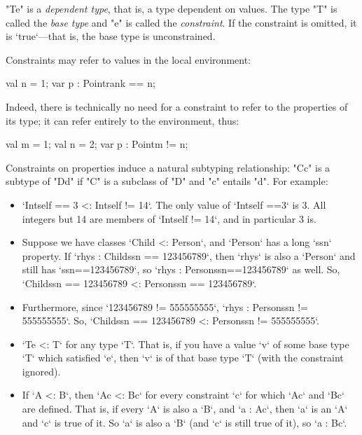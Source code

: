\xcd"T{e}" is a {\em dependent type}, that is, a type dependent on values. The
type \xcd"T" is called the {\em base type} and \xcd"e" is called the {\em
  constraint}. If the constraint is omitted, it is \xcd`true`---that is, the
  base type is unconstrained.

Constraints may refer to values in the local environment: 
\begin{xten}
     val n = 1;
     var p : Point{rank == n};
\end{xten}
Indeed, there is technically no need for a constraint to refer to the
properties of its type; it can refer entirely to the environment, thus: 
\begin{xten}
     val m = 1;
     val n = 2;
     var p : Point{m != n};
\end{xten}

Constraints on properties induce a natural subtyping relationship:
\xcd"C{c}" is a subtype of
\xcd"D{d}" if \xcd"C" is a subclass of \xcd"D" and
\xcd"c" entails \xcd"d".
For example: 
\begin{itemize}
\item \xcd`Int{self == 3} <: Int{self != 14}`.  The only value of
      \xcd`Int{self ==3}` is 3.  All integers but 14 are members of
      \xcd`Int{self != 14}`, and in particular 3 is.  
\item Suppose we have classes \xcd`Child <: Person`, and \xcd`Person` has a
      long \xcd`ssn` property.  If \xcd`rhys : Child{ssn == 123456789}`, then
      \xcd`rhys` is also a \xcd`Person` and still has \xcd`ssn==123456789`, so 
      \xcd`rhys : Person{ssn==123456789}` as well.  
      So, \xcd`Child{ssn == 123456789} <: Person{ssn == 123456789}`.
\item Furthermore, since \xcd`123456789 != 555555555`, 
      \xcd`rhys : Person{ssn != 555555555}`.  
      So, \xcd`Child{ssn == 123456789} <: Person{ssn != 555555555}`.  
\item \xcd`T{e} <: T` for any type \xcd`T`.  That is, if you have a value
      \xcd`v` of some base type \xcd`T` which satisfied \xcd`e`, then \xcd`v`
      is of that base type \xcd`T` (with the constraint ignored).
\item If \xcd`A <: B`, then \xcd`A{c} <: B{c}` for every constraint \xcd`{c}`
      for which \xcd`A{c}` and \xcd`B{c}` are defined.  That is, if every
      \xcd`A` is also a \xcd`B`, and \xcd`a : A{c}`, then 
      \xcd`a` is an \xcd`A` and \xcd`c` is true of it. So \xcd`a` is also a
      \xcd`B` (and \xcd`c` is still true of 
      it), so \xcd`a : B{c}`.  

\end{itemize}


